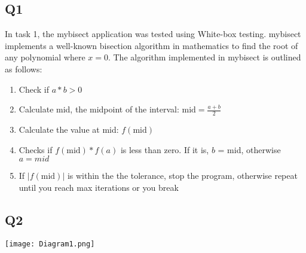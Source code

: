 \documentclass[12pt, letterpaper, titlepage]{article}
\begin{document}
\subsection*{Q1}
In task 1, the mybisect application was tested using White-box testing. mybisect implements a well-known bisection algorithm in mathematics to find the root of any polynomial where $x=0$. The algorithm implemented in mybisect is outlined as follows:
\begin{enumerate}
    \item Check if $a*b > 0$
    \item Calculate mid, the midpoint of the interval: $\text{mid} = \frac{a+b}{2}$
    \item Calculate the value at mid: $f(\text{mid})$
    \item Checks if $f(\text{mid})*f(a)$ is less than zero. If it is, $b$ = mid, otherwise $a = mid$
    \item If $|f(\text{mid})|$ is within the the tolerance, stop the program, otherwise repeat until you reach max iterations or you break
\end{enumerate}

\subsection*{Q2}
\begin{centering}
\texttt{[image: Diagram1.png]}
\end{centering}

\newpage
\end{document}

